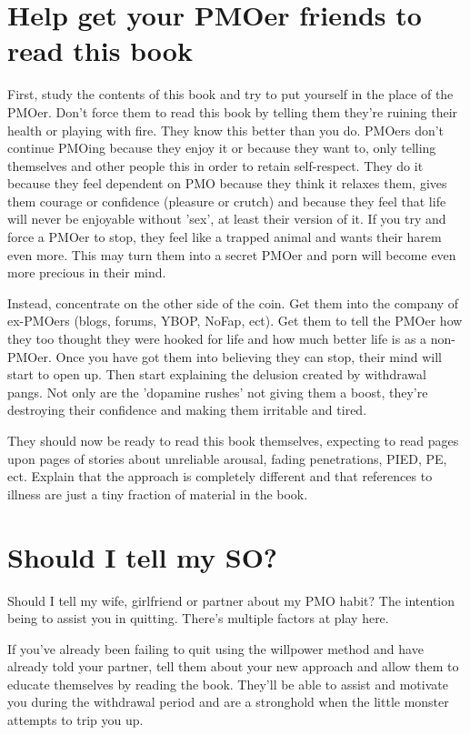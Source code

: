 \documentclass[easypeasy.tex]{subfiles}
\begin{document}
\section{Help get your PMOer friends to read this book}

First, study the contents of this book and try to put yourself in the place of the PMOer. Don't force them to read this book by telling them they're ruining their health or playing with fire. They know this better than you do. PMOers don't continue PMOing because they enjoy it or because they want to, only telling themselves and other people this in order to retain self-respect. They do it because they feel dependent on PMO because they think it relaxes them, gives them courage or confidence (pleasure or crutch) and because they feel that life will never be enjoyable without 'sex', at least their version of it. If you try and force a PMOer to stop, they feel like a trapped animal and wants their harem even more. This may turn them into a secret PMOer and porn will become even more precious in their mind.

Instead, concentrate on the other side of the coin. Get them into the company of ex-PMOers (blogs, forums, YBOP, NoFap, ect). Get them to tell the PMOer how they too thought they were hooked for life and how much better life is as a non-PMOer. Once you have got them into believing they can stop, their mind will start to open up. Then start explaining the delusion created by withdrawal pangs. Not only are the 'dopamine rushes' not giving them a boost, they're destroying their confidence and making them irritable and tired.

They should now be ready to read this book themselves, expecting to read pages upon pages of stories about unreliable arousal, fading penetrations, PIED, PE, ect. Explain that the approach is completely different and that references to illness are just a tiny fraction of material in the book.

\section{Should I tell my SO?}

Should I tell my wife, girlfriend or partner about my PMO habit? The intention being to assist you in quitting. There's multiple factors at play here.

If you've already been failing to quit using the willpower method and have already told your partner, tell them about your new approach and allow them to educate themselves by reading the book. They'll be able to assist and motivate you during the withdrawal period and are a stronghold when the little monster attempts to trip you up.
\end{document}
